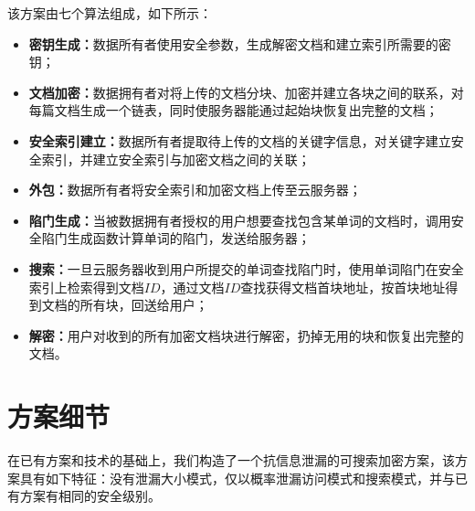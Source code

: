 该方案由七个算法组成，如下所示：
\begin{itemize}
  \item \textbf{密钥生成：}数据所有者使用安全参数，生成解密文档和建立索引所需要的密钥；

  \item \textbf{文档加密：}数据拥有者对将上传的文档分块、加密并建立各块之间的联系，对每篇文档生成一个链表，同时使服务器能通过起始块恢复出完整的文档；

  \item \textbf{安全索引建立：}数据所有者提取待上传的文档的关键字信息，对关键字建立安全索引，并建立安全索引与加密文档之间的关联；
 
  \item \textbf{外包：}数据所有者将安全索引和加密文档上传至云服务器；

  \item \textbf{陷门生成：}当被数据拥有者授权的用户想要查找包含某单词的文档时，调用安全陷门生成函数计算单词的陷门，发送给服务器；

  \item \textbf{搜索：}一旦云服务器收到用户所提交的单词查找陷门时，使用单词陷门在安全索引上检索得到文档$ID$，通过文档$ID$查找获得文档首块地址，按首块地址得到文档的所有块，回送给用户；

  \item \textbf{解密：}用户对收到的所有加密文档块进行解密，扔掉无用的块和恢复出完整的文档。
\end{itemize}



\section{方案细节}
\label{sec:searchpattern_scheme}

在已有方案和技术的基础上，我们构造了一个抗信息泄漏的可搜索加密方案，该方案具有如下特征：没有泄漏大小模式，仅以概率泄漏访问模式和搜索模式，并与已有方案有相同的安全级别。

